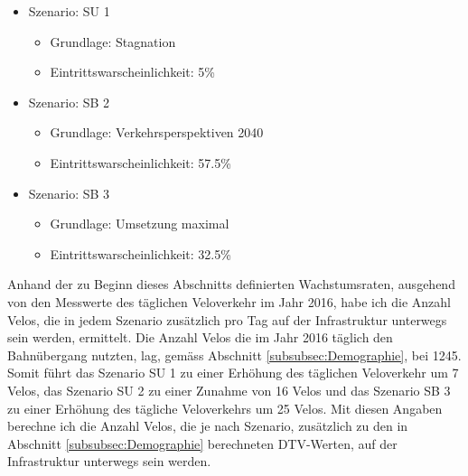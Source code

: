 \begin{itemize}
\item Szenario: SU 1
	\begin{itemize}
	\item Grundlage: Stagnation 
	\item Eintrittswarscheinlichkeit: 5\%
	\end{itemize}
\item Szenario: SB 2
	\begin{itemize}
	\item Grundlage: Verkehrsperspektiven 2040
	\item Eintrittswarscheinlichkeit: 57.5\%
	\end{itemize}
\item Szenario: SB 3
	\begin{itemize}
	\item Grundlage: Umsetzung maximal
	\item Eintrittswarscheinlichkeit: 32.5\%
	\end{itemize}
\end{itemize}

Anhand der zu Beginn dieses Abschnitts definierten Wachstumsraten, ausgehend von den Messwerte des täglichen Veloverkehr im Jahr 2016, habe ich die Anzahl Velos, die in jedem Szenario zusätzlich pro Tag auf der Infrastruktur unterwegs sein werden, ermittelt. Die Anzahl Velos die im Jahr 2016 täglich den Bahnübergang nutzten, lag, gemäss Abschnitt \ref{subsubsec:Demographie}, bei 1245.
Somit führt das Szenario SU 1 zu einer Erhöhung des täglichen Veloverkehr um 7 Velos, das Szenario SU 2 zu einer Zunahme von 16 Velos und das Szenario SB 3 zu einer Erhöhung des tägliche Veloverkehrs um 25 Velos. 
Mit diesen Angaben berechne ich die Anzahl Velos, die je nach Szenario, zusätzlich zu den in Abschnitt \ref{subsubsec:Demographie} berechneten DTV-Werten, auf der Infrastruktur unterwegs sein werden.


%

